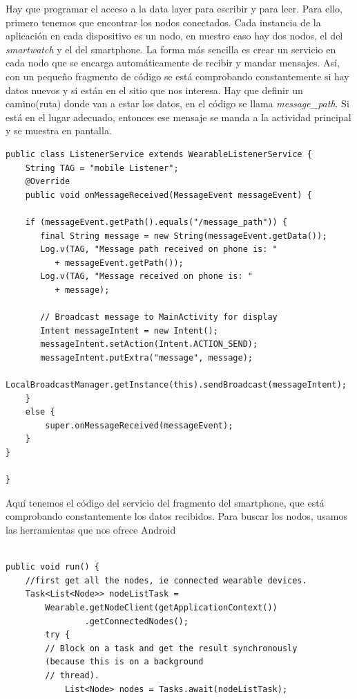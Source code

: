 \documentclass[12pt]{article}
\numberwithin{equation}{section}
\begin{document}
{Hay que programar el acceso a la data layer para escribir y para leer. Para ello, primero tenemos que encontrar los nodos conectados. Cada instancia de la aplicación en cada dispositivo es un nodo, en nuestro caso hay dos nodos, el del \textit{smartwatch} y el del smartphone. La forma más sencilla es crear un servicio en cada nodo que se encarga automáticamente de recibir y mandar mensajes. Así, con un pequeño fragmento de código se está comprobando constantemente si hay datos nuevos y si están en el sitio que nos interesa. Hay que definir un camino(ruta) donde van a estar los datos, en el código se llama \textit{message\_path}. Si está en el lugar adecuado, entonces ese mensaje se manda a la actividad principal y se muestra en pantalla.


\begin{lstlisting}
public class ListenerService extends WearableListenerService {
    String TAG = "mobile Listener";
    @Override
    public void onMessageReceived(MessageEvent messageEvent) {

    if (messageEvent.getPath().equals("/message_path")) {
       final String message = new String(messageEvent.getData());
       Log.v(TAG, "Message path received on phone is: "
          + messageEvent.getPath());
       Log.v(TAG, "Message received on phone is: "
          + message);

       // Broadcast message to MainActivity for display
       Intent messageIntent = new Intent();
       messageIntent.setAction(Intent.ACTION_SEND);
       messageIntent.putExtra("message", message);
       LocalBroadcastManager.getInstance(this).sendBroadcast(messageIntent);
    }
    else {
        super.onMessageReceived(messageEvent);
    }
}

}

\end{lstlisting}


Aquí tenemos el código del servicio del fragmento del smartphone, que está comprobando constantemente los datos recibidos. Para buscar los nodos, usamos las herramientas que nos ofrece Android

\begin{lstlisting}

public void run() {
	//first get all the nodes, ie connected wearable devices.
    Task<List<Node>> nodeListTask =
    	Wearable.getNodeClient(getApplicationContext())
                .getConnectedNodes();
        try {
        // Block on a task and get the result synchronously 
        (because this is on a background
        // thread).
        	List<Node> nodes = Tasks.await(nodeListTask);


\end{lstlisting}}
\end{document}
